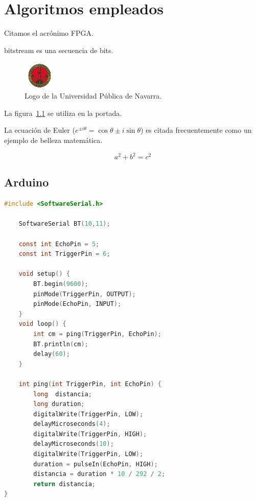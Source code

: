 \chapter{Algoritmos empleados\label{sec:ejemplos}}

%
%



Citamos el acrónimo \gls{FPGA}.

\Gls{bitstream} es una secuencia de bits.

\begin{figure}[H]
  \centering
  \includegraphics[width=0.14\textwidth,clip=true]{escudo}
  \caption{Logo de la Universidad Pública de Navarra.}
  \label{fig:logo_upna}
\end{figure} 

La figura~\ref{fig:logo_upna} se utiliza en la portada.

\clearpage



La ecuación de Euler ($e^{ \pm i\theta } = \cos \theta \pm i\sin \theta$) es citada frecuentemente como un ejemplo de belleza matemática.

\begin{equation}\label{eq:pythagoras}
a^2 + b^2 = c^2
\end{equation}


	
\section{Arduino}
	
		\begin{lstlisting}[label=algoritmo:Arduino,language=C,frame=single,caption=Algortimo en Arduino para obtención de distancia sensor ultrasonido]
	#include <SoftwareSerial.h> 
			
	SoftwareSerial BT(10,11);
			
	const int EchoPin = 5;
	const int TriggerPin = 6;
			
	void setup() {
		BT.begin(9600);
		pinMode(TriggerPin, OUTPUT);
		pinMode(EchoPin, INPUT);
	}	
	void loop() {
		int cm = ping(TriggerPin, EchoPin);
		BT.println(cm);
		delay(60);
	}
			
	int ping(int TriggerPin, int EchoPin) {
		long  distancia;
		long duration;
		digitalWrite(TriggerPin, LOW);  
		delayMicroseconds(4);
		digitalWrite(TriggerPin, HIGH); 
		delayMicroseconds(10);
		digitalWrite(TriggerPin, LOW);		
		duration = pulseIn(EchoPin, HIGH);  	
		distancia = duration * 10 / 292 / 2;  
		return distancia;			
}
		\end{lstlisting}
	